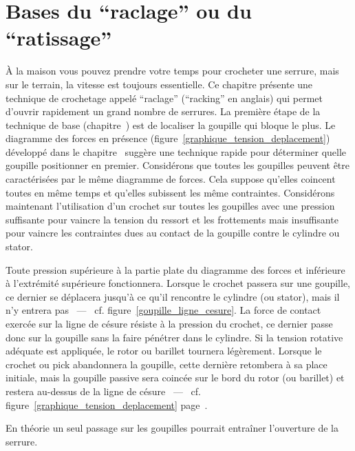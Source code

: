\documentclass[a4paper,french,11pt,twoside]{report}
\begin{document}
\chapter{\label{chap:raclage_ratissage}Bases du \enquote{raclage} ou du \enquote{ratissage}}

À la maison vous pouvez prendre votre temps pour crocheter une serrure, mais sur le terrain, la vitesse est toujours essentielle. Ce chapitre présente une technique de crochetage appelé \enquote{raclage} (\enquote{racking} en anglais) qui permet d'ouvrir rapidement un grand nombre de serrures. La première étape de la technique de base (chapitre~) est de localiser la goupille qui bloque le plus. Le diagramme des forces en présence (figure~\ref{graphique_tension_deplacement}) développé dans le chapitre~ suggère une technique rapide pour déterminer quelle goupille positionner en premier. Considérons que toutes les goupilles peuvent être caractérisées par le même diagramme de forces. Cela suppose qu'elles coincent toutes en même temps et qu'elles subissent les même contraintes. Considérons maintenant l'utilisation d'un crochet sur toutes les goupilles avec une pression suffisante pour vaincre la tension du ressort et les frottements mais insuffisante pour vaincre les contraintes dues au contact de la goupille contre le cylindre ou stator.

Toute pression supérieure à la partie plate du diagramme des forces et inférieure à l'extrémité supérieure fonctionnera. Lorsque le crochet passera sur une goupille, ce dernier se déplacera jusqu'à ce qu'il rencontre le cylindre (ou stator), mais il n'y entrera pas ~---~ cf. figure~\ref{goupille_ligne_cesure}. La force de contact exercée sur la ligne de césure résiste à la pression du crochet, ce dernier passe donc sur la goupille sans la faire pénétrer dans le cylindre. Si la tension rotative adéquate est appliquée, le rotor ou barillet tournera légèrement. Lorsque le crochet ou pick abandonnera la goupille, cette dernière retombera à sa place initiale, mais la goupille passive sera coincée sur le bord du rotor (ou barillet) et restera au-dessus de la ligne de césure ~---~ cf. figure~\ref{graphique_tension_deplacement} page~\pageref{graphique_tension_deplacement}.

En théorie un seul passage sur les goupilles pourrait entraîner l'ouverture de la serrure.
\end{document}

